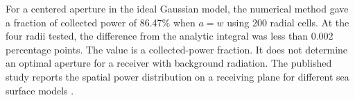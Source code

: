 For a centered aperture in the ideal Gaussian model, the numerical method
gave a fraction of collected power of 86.47\% when $a=w$
using 200 radial cells. At the four radii tested, the difference from
the analytic integral was less than 0.002 percentage points.
The value is a collected-power fraction. It does not determine an
optimal aperture for a receiver with background radiation.
The published study reports the spatial power distribution on a receiving
plane for different sea surface models \cite{Gao2025}.
